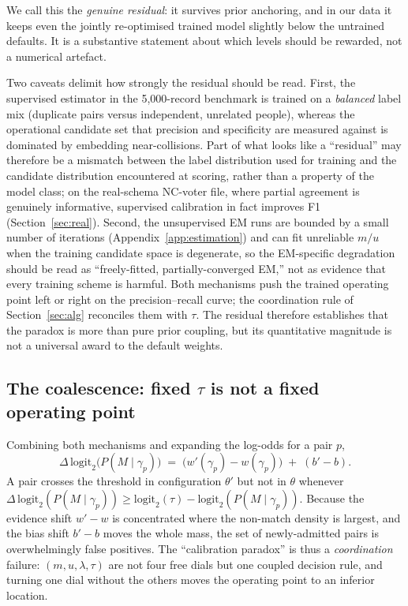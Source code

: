 \documentclass[11pt]{article}
\begin{document}
We call this the \emph{genuine residual}: it survives prior anchoring, and in our data it
keeps even the jointly re-optimised trained model slightly below the untrained defaults.
It is a substantive statement about which levels should be rewarded, not a numerical
artefact.

Two caveats delimit how strongly the residual should be read. First, the supervised
estimator in the 5{,}000-record benchmark is trained on a \emph{balanced} label mix
(duplicate pairs versus independent, unrelated people), whereas the operational candidate
set that precision and specificity are measured against is dominated by embedding
near-collisions. Part of what looks like a ``residual'' may therefore be a mismatch between
the label distribution used for training and the candidate distribution encountered at
scoring, rather than a property of the model class; on the real-schema NC-voter file, where
partial agreement is genuinely informative, supervised calibration in fact improves F1
(Section~\ref{sec:real}). Second, the unsupervised EM runs are bounded by a small number of
iterations (Appendix~\ref{app:estimation}) and can fit unreliable $m/u$ when the training
candidate space is degenerate, so the EM-specific degradation should be read as
``freely-fitted, partially-converged EM,'' not as evidence that every training scheme is
harmful. Both mechanisms push the trained operating point left or right on the
precision--recall curve; the coordination rule of Section~\ref{sec:alg} reconciles them
with $\tau$. The residual therefore establishes that the paradox is more than pure prior
coupling, but its quantitative magnitude is not a universal award to the default weights.

\subsection{The coalescence: fixed $\tau$ is not a fixed operating point}
Combining both mechanisms and expanding the log-odds for a pair $p$,
\begin{equation}
\Delta\,\mathrm{logit}_2\bigl(P(M\mid\gamma_p)\bigr)
\;=\;\bigl(w'(\gamma_p)-w(\gamma_p)\bigr)\;+\;(b'-b).
\label{eq:delta}
\end{equation}
A pair crosses the threshold in configuration $\theta'$ but not in $\theta$ whenever
$\Delta\,\mathrm{logit}_2(P(M\mid\gamma_p))\ge
\mathrm{logit}_2(\tau)-\mathrm{logit}_2(P(M\mid\gamma_p))$. Because the evidence shift
$w'-w$ is concentrated where the non-match density is largest, and the bias shift $b'-b$
moves the whole mass, the set of newly-admitted pairs is overwhelmingly false positives.
The ``calibration paradox'' is thus a \emph{coordination} failure: $(m,u,\lambda,\tau)$ are
not four free dials but one coupled decision rule, and turning one dial without the others
moves the operating point to an inferior location.
\end{document}

